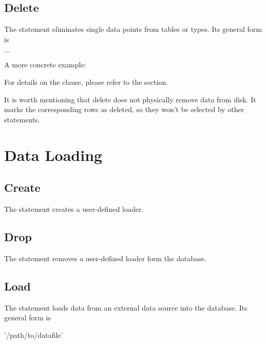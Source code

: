 \subsection{Delete}
The  statement eliminates single
data points from tables or types.
Its general form is

   $\dots$

A more concrete example:

 
 

For details on the  clause,
please refer to the  section.

It is worth mentioning that delete
does not physically remove data from disk.
It marks the corresponding rows as deleted,
so they won't be selected by other statements.


\section{Data Loading}
\subsection{Create}
The  statement creates a user-defined loader.


\subsection{Drop}
The  statement removes a user-defined loader
form the database.


\subsection{Load}
The  statement loads data from an external
data source into the database.
Its general form is

 '/path/to/datafile'  


